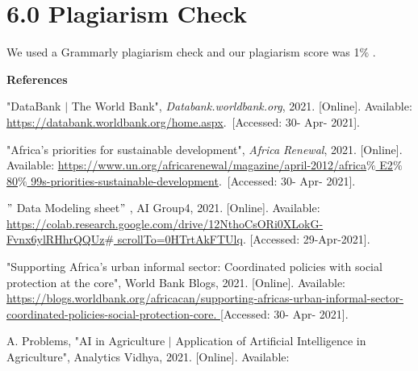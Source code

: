 \documentclass[12pt]{article}
\renewcommand{\_}{\kern-1.5pt\textunderscore\kern-1.5pt}
\begin{document}

\section*{6.0 Plagiarism Check}
{\fontsize{9pt}{10.8pt}\selectfont We used a Grammarly plagiarism check and our plagiarism score was 1$\%$ .}

\vspace{\baselineskip}

\vspace{\baselineskip}

\vspace{\baselineskip}
{\fontsize{9pt}{10.8pt}\selectfont \textbf{References}}
{\fontsize{9pt}{10.8pt}\selectfont [1]"DataBank $ \vert $  The World Bank", \textit{Databank.worldbank.org}, 2021. [Online]. Available: \href{https://databank.worldbank.org/home.aspx}{\textcolor[HTML]{1155CC}{\ul{https://databank.worldbank.org/home.aspx}}}.\  [Accessed: 30- Apr- 2021]. \par}
{\fontsize{9pt}{10.8pt}\selectfont [2]"Africa’s priorities for sustainable development", \textit{Africa Renewal}, 2021. [Online]. Available: \href{https://www.un.org/africarenewal/magazine/april-2012/africa\%E2\%80\%99s-priorities-sustainable-development}{\textcolor[HTML]{1155CC}{\ul{https://www.un.org/africarenewal/magazine/april-2012/africa$\%$ E2$\%$ 80$\%$ 99s-priorities-sustainable-development}}}.\  [Accessed: 30- Apr- 2021].\par}
{\fontsize{9pt}{10.8pt}\selectfont [3]$"$ Data Modeling sheet$"$ , AI Group4, 2021. [Online]. Available: \href{https://colab.research.google.com/drive/12NthoCsORi0XLokG-Fvnx6ylRHhrQQUz#scrollTo=0HTrtAkFTUlq}{\textcolor[HTML]{1155CC}{\ul{https://colab.research.google.com/drive/12NthoCsORi0XLokG-Fvnx6ylRHhrQQUz$\#$ scrollTo=0HTrtAkFTUlq}}}. [Accessed: 29-Apr-2021].\par}
{\fontsize{9pt}{10.8pt}\selectfont [4]"Supporting Africa’s urban informal sector: Coordinated policies with social protection at the core", World Bank Blogs, 2021. [Online]. Available: \href{https://blogs.worldbank.org/africacan/supporting-africas-urban-informal-sector-coordinated-policies-social-protection-core.}{\textcolor[HTML]{1155CC}{\ul{https://blogs.worldbank.org/africacan/supporting-africas-urban-informal-sector-coordinated-policies-social-protection-core. [}}}Accessed: 30- Apr- 2021].\par}
{\fontsize{9pt}{10.8pt}\selectfont [5]A. Problems, "AI in Agriculture $ \vert $  Application of Artificial Intelligence in Agriculture", Analytics Vidhya, 2021. [Online]. Available:\par}
\end{document}
